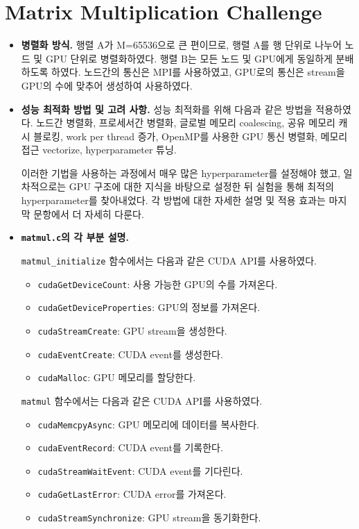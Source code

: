 \section{Matrix Multiplication Challenge}

\begin{itemize}

    \item {
        \textbf{병렬화 방식.}
        행렬 A가 M=65536으로 큰 편이므로, 행렬 A를 행 단위로 나누어 노드 및 GPU 단위로 병렬화하였다.
        행렬 B는 모든 노드 및 GPU에게 동일하게 분배하도록 하였다.
        노드간의 통신은 MPI를 사용하였고, GPU로의 통신은 stream을 GPU의 수에 맞추어 생성하여 사용하였다.
    }
    \item {
        \textbf{성능 최적화 방법 및 고려 사항.}
        성능 최적화를 위해 다음과 같은 방법을 적용하였다. 노드간 병렬화, 프로세서간 병렬화,
        글로벌 메모리 coalescing, 공유 메모리 캐시 블로킹, work per thread 증가,
        OpenMP를 사용한 GPU 통신 병렬화, 메모리 접근 vectorize, hyperparameter 튜닝.

        이러한 기법을 사용하는 과정에서 매우 많은 hyperparameter를 설정해야 했고,
        일차적으로는 GPU 구조에 대한 지식을 바탕으로 설정한 뒤 실험을 통해 최적의 hyperparameter를 찾아내었다.
        각 방법에 대한 자세한 설명 및 적용 효과는 마지막 문항에서 더 자세히 다룬다.
    }
    \item {
        \textbf{\texttt{matmul.c}의 각 부분 설명.}

        \texttt{matmul\_initialize} 함수에서는 다음과 같은 CUDA API를 사용하였다.

        \begin{itemize}
            \item \texttt{cudaGetDeviceCount}: 사용 가능한 GPU의 수를 가져온다.
            \item \texttt{cudaGetDeviceProperties}: GPU의 정보를 가져온다.
            \item \texttt{cudaStreamCreate}: GPU stream을 생성한다.
            \item \texttt{cudaEventCreate}: CUDA event를 생성한다.
            \item \texttt{cudaMalloc}: GPU 메모리를 할당한다.
        \end{itemize}

        \texttt{matmul} 함수에서는 다음과 같은 CUDA API를 사용하였다.

        \begin{itemize}
            \item \texttt{cudaMemcpyAsync}: GPU 메모리에 데이터를 복사한다.
            \item \texttt{cudaEventRecord}: CUDA event를 기록한다.
            \item \texttt{cudaStreamWaitEvent}: CUDA event를 기다린다.
            \item \texttt{cudaGetLastError}: CUDA error를 가져온다.
            \item \texttt{cudaStreamSynchronize}: GPU stream을 동기화한다.
        \end{itemize}

}
\end{itemize}
